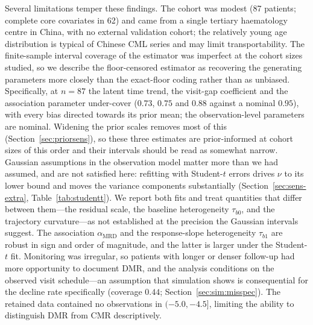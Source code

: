 \documentclass[11pt]{article}
\begin{document}
Several limitations temper these findings. The cohort was modest (87
patients; complete core covariates in 62) and came from a single tertiary
haematology centre in China, with no external validation cohort; the
relatively young age distribution is typical of Chinese CML series and may
limit transportability. The finite-sample interval coverage of the estimator
was imperfect at the cohort sizes studied, so we describe the floor-censored
estimator as recovering the generating parameters more closely than the
exact-floor coding rather than as unbiased. Specifically, at $n=87$ the latent
time trend, the visit-gap coefficient and the association parameter under-cover
($0.73$, $0.75$ and $0.88$ against a nominal $0.95$), with every bias directed
towards its prior mean; the observation-level parameters are nominal. Widening
the prior scales removes most of this (Section~\ref{sec:priorsens}), so these
three estimates are prior-informed at cohort sizes of this order and their
intervals should be read as somewhat narrow. Gaussian assumptions in the
observation model matter more than we had assumed, and are not satisfied here:
refitting with Student-$t$ errors drives $\nu$ to its lower bound and moves the
variance components substantially (Section~\ref{sec:sens-extra},
Table~\ref{tab:studentt}). We report both fits and treat quantities that differ
between them---the residual scale, the baseline heterogeneity $\tau_{b0}$, and
the trajectory curvature---as not established at the precision the Gaussian
intervals suggest. The association $\alpha_{\mathrm{MRD}}$ and the response-slope
heterogeneity $\tau_{b1}$ are robust in sign and order of magnitude, and the
latter is larger under the Student-$t$ fit. Monitoring was irregular, so
patients with longer or denser follow-up had more opportunity to document
DMR, and the analysis conditions on the observed visit schedule---an assumption
that simulation shows is consequential for the decline rate specifically
(coverage $0.44$; Section~\ref{sec:sim:misspec}). The
retained data contained no observations in $(-5.0,-4.5]$, limiting the
ability to distinguish DMR from CMR descriptively.
\end{document}
